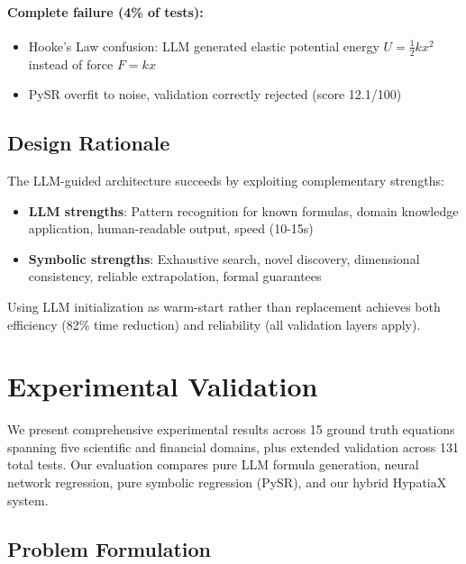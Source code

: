 \documentclass[twoside,11pt]{article}
\begin{document}
\paragraph{Complete failure (4\% of tests):}
\begin{itemize}
\item Hooke's Law confusion: LLM generated elastic potential energy $U = \frac{1}{2}kx^2$ instead of force $F = kx$
\item PySR overfit to noise, validation correctly rejected (score 12.1/100)
\end{itemize}

\subsection{Design Rationale}

The LLM-guided architecture succeeds by exploiting complementary strengths:

\begin{itemize}
\item \textbf{LLM strengths}: Pattern recognition for known formulas, domain knowledge application, human-readable output, speed (10-15s)
\item \textbf{Symbolic strengths}: Exhaustive search, novel discovery, dimensional consistency, reliable extrapolation, formal guarantees
\end{itemize}

Using LLM initialization as warm-start rather than replacement achieves both efficiency (82\% time reduction) and reliability (all validation layers apply).


\section{Experimental Validation}
\label{sec:experiments}

We present comprehensive experimental results across 15 ground truth equations spanning five scientific and financial domains, plus extended validation across 131 total tests. Our evaluation compares pure LLM formula generation, neural network regression, pure symbolic regression (PySR), and our hybrid HypatiaX system.

\subsection{Problem Formulation}
\end{document}
